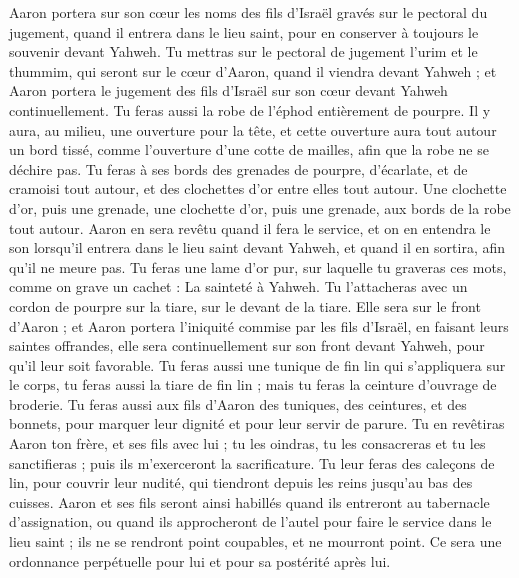 \begin{multicols}{2}
Aaron portera sur son cœur les noms des fils d'Israël gravés sur le pectoral du jugement, quand il entrera dans le lieu saint, pour en conserver à toujours le souvenir devant Yahweh.
Tu mettras sur le pectoral de jugement l'urim et le thummim, qui seront sur le cœur d'Aaron, quand il viendra devant Yahweh ; et Aaron portera le jugement des fils d'Israël sur son cœur devant Yahweh continuellement.
Tu feras aussi la robe de l'éphod entièrement de pourpre.
Il y aura, au milieu, une ouverture pour la tête, et cette ouverture aura tout autour un bord tissé, comme l’ouverture d’une cotte de mailles, afin que la robe ne se déchire pas.
Tu feras à ses bords des grenades de pourpre, d'écarlate, et de cramoisi tout autour, et des clochettes d'or entre elles tout autour.
Une clochette d'or, puis une grenade, une clochette d'or, puis une grenade, aux bords de la robe tout autour.
Aaron en sera revêtu quand il fera le service, et on en entendra le son lorsqu'il entrera dans le lieu saint devant Yahweh, et quand il en sortira, afin qu'il ne meure pas.
Tu feras une lame d’or pur, sur laquelle tu graveras ces mots, comme on grave un cachet : La sainteté à Yahweh.
Tu l’attacheras avec un cordon de pourpre sur la tiare, sur le devant de la tiare.
Elle sera sur le front d'Aaron ; et Aaron portera l'iniquité commise par les fils d’Israël, en faisant leurs saintes offrandes, elle sera continuellement sur son front devant Yahweh, pour qu’il leur soit favorable.
Tu feras aussi une tunique de fin lin qui s'appliquera sur le corps, tu feras aussi la tiare de fin lin ; mais tu feras la ceinture d'ouvrage de broderie.
Tu feras aussi aux fils d'Aaron des tuniques, des ceintures, et des bonnets, pour marquer leur dignité et pour leur servir de parure.
Tu en revêtiras Aaron ton frère, et ses fils avec lui ; tu les oindras, tu les consacreras et tu les sanctifieras ; puis ils m'exerceront la sacrificature.
Tu leur feras des caleçons de lin, pour couvrir leur nudité, qui tiendront depuis les reins jusqu'au bas des cuisses.
Aaron et ses fils seront ainsi habillés quand ils entreront au tabernacle d'assignation, ou quand ils approcheront de l'autel pour faire le service dans le lieu saint ; ils ne se rendront point coupables, et ne mourront point. Ce sera une ordonnance perpétuelle pour lui et pour sa postérité après lui.

\end{multicols}

